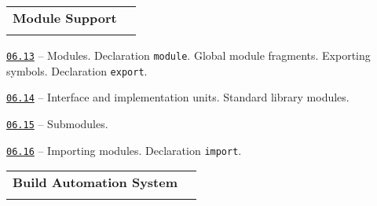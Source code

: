 \documentclass[a4paper,12pt]{article}
\renewenvironment{itemize}
{
    \begin{list}{\labelitemi}
    {
      \setlength{\topsep}{0pt}
      \setlength{\partopsep}{0pt}
      \setlength{\parskip}{0pt}
      \setlength{\itemsep}{0pt}
      \setlength{\parsep}{0pt}
      \setlength{\leftmargin}{14.5pt}
    }
}{\end{list}}
\begin{document}
\bigskip\medskip

\begin{tabular}{!{\vrule width 1pt}L{3.2cm}!{\vrule width 1pt}L{15.8cm}!{\vrule width 0pt}} 


\textbf{Module Support} & \\


\end{tabular}

\medskip\smallskip

\begin{itemize}

    \item \href{https://github.com/i-s-m-mipt/Education/blob/master/projects/examples/source/06.13.cxx}{\texttt{06.13}} -- Modules. Declaration \lstinline{module}. Global module fragments. Exporting symbols. Declaration \lstinline{export}.

    \smallskip

    \item \href{https://github.com/i-s-m-mipt/Education/blob/master/projects/examples/source/06.14.cxx}{\texttt{06.14}} -- Interface and implementation units. Standard library modules.

    \smallskip

    \item \href{https://github.com/i-s-m-mipt/Education/blob/master/projects/examples/source/06.15.cxx}{\texttt{06.15}} -- Submodules.

    \smallskip

    \item \href{https://github.com/i-s-m-mipt/Education/blob/master/projects/examples/source/06.16.cpp}{\texttt{06.16}} -- Importing modules. Declaration \lstinline{import}.

    \smallskip

\end{itemize}

\bigskip\medskip

\begin{tabular}{!{\vrule width 1pt}L{5.1cm}!{\vrule width 1pt}L{13.9cm}!{\vrule width 0pt}} 


\textbf{Build Automation System} & \\


\end{tabular}
\end{document}
